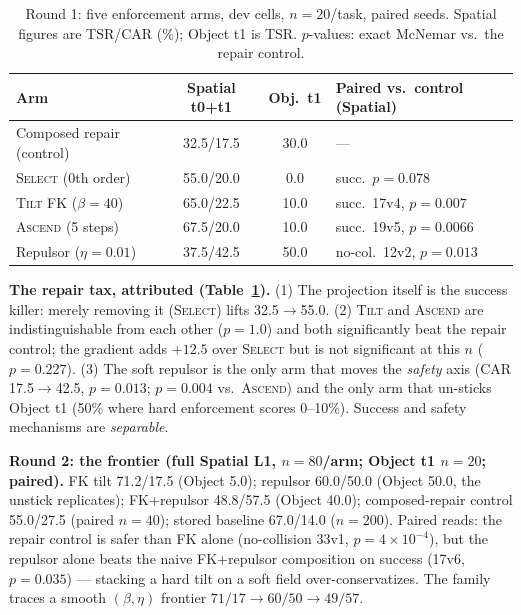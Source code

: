 \documentclass[conference]{IEEEtran}
\begin{document}
\begin{table}[t]
\centering
\caption{Round 1: five enforcement arms, dev cells, $n{=}20$/task, paired seeds. Spatial figures are TSR/CAR (\%); Object t1 is TSR. $p$-values: exact McNemar vs.\ the repair control.}
\label{tab:round1}
\setlength{\tabcolsep}{3.5pt}
\begin{tabular}{lccl}
\toprule
Arm & Spatial t0+t1 & Obj.\ t1 & Paired vs.\ control (Spatial) \\
\midrule
Composed repair (control) & 32.5/17.5 & 30.0 & --- \\
\textsc{Select} (0th order) & 55.0/20.0 & 0.0 & succ.\ $p=0.078$ \\
\textsc{Tilt} FK ($\beta{=}40$) & 65.0/22.5 & 10.0 & succ.\ 17v4, $p=0.007$ \\
\textsc{Ascend} (5 steps) & 67.5/20.0 & 10.0 & succ.\ 19v5, $p=0.0066$ \\
Repulsor ($\eta{=}0.01$) & 37.5/42.5 & 50.0 & no-col.\ 12v2, $p=0.013$ \\
\bottomrule
\end{tabular}
\end{table}

\textbf{The repair tax, attributed (Table~\ref{tab:round1}).} (1) The projection itself is the success killer: merely removing it (\textsc{Select}) lifts 32.5$\to$55.0. (2) \textsc{Tilt} and \textsc{Ascend} are indistinguishable from each other ($p=1.0$) and both significantly beat the repair control; the gradient adds $+12.5$ over \textsc{Select} but is not significant at this $n$ ($p=0.227$). (3) The soft repulsor is the only arm that moves the \emph{safety} axis (CAR 17.5$\to$42.5, $p=0.013$; $p=0.004$ vs.\ \textsc{Ascend}) and the only arm that un-sticks Object t1 (50\% where hard enforcement scores 0--10\%). Success and safety mechanisms are \emph{separable}.

\textbf{Round 2: the frontier (full Spatial L1, $n{=}80$/arm; Object t1 $n{=}20$; paired).} FK tilt 71.2/17.5 (Object 5.0); repulsor 60.0/50.0 (Object 50.0, the unstick replicates); FK+repulsor 48.8/57.5 (Object 40.0); composed-repair control 55.0/27.5 (paired $n{=}40$); stored baseline 67.0/14.0 ($n{=}200$). Paired reads: the repair control is safer than FK alone (no-collision 33v1, $p=4\times10^{-4}$), but the repulsor alone beats the naive FK+repulsor composition on success (17v6, $p=0.035$) --- stacking a hard tilt on a soft field over-conservatizes. The family traces a smooth $(\beta,\eta)$ frontier $71/17\to60/50\to49/57$.
\end{document}
